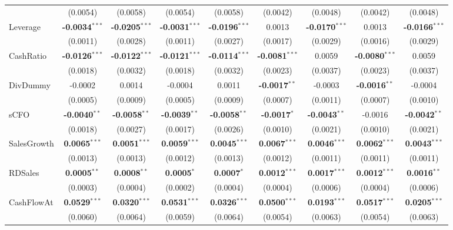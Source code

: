 \documentclass[11pt,a4paper]{article}
\begin{document}
\begin{table}[htbp]
\begin{tabular}{lcccccccc}
 & (0.0054) & (0.0058) & (0.0054) & (0.0058) & (0.0042) & (0.0048) & (0.0042) & (0.0048) \\
Leverage & \textbf{-0.0034}$^{***}$ & \textbf{-0.0205}$^{***}$ & \textbf{-0.0031}$^{***}$ & \textbf{-0.0196}$^{***}$ & 0.0013 & \textbf{-0.0170}$^{***}$ & 0.0013 & \textbf{-0.0166}$^{***}$ \\
 & (0.0011) & (0.0028) & (0.0011) & (0.0027) & (0.0017) & (0.0029) & (0.0016) & (0.0029) \\
CashRatio & \textbf{-0.0126}$^{***}$ & \textbf{-0.0122}$^{***}$ & \textbf{-0.0121}$^{***}$ & \textbf{-0.0114}$^{***}$ & \textbf{-0.0081}$^{***}$ & 0.0059 & \textbf{-0.0080}$^{***}$ & 0.0059 \\
 & (0.0018) & (0.0032) & (0.0018) & (0.0032) & (0.0023) & (0.0037) & (0.0023) & (0.0037) \\
DivDummy & -0.0002 & 0.0014 & -0.0004 & 0.0011 & \textbf{-0.0017}$^{**}$ & -0.0003 & \textbf{-0.0016}$^{**}$ & -0.0004 \\
 & (0.0005) & (0.0009) & (0.0005) & (0.0009) & (0.0007) & (0.0011) & (0.0007) & (0.0010) \\
sCFO & \textbf{-0.0040}$^{**}$ & \textbf{-0.0058}$^{**}$ & \textbf{-0.0039}$^{**}$ & \textbf{-0.0058}$^{**}$ & \textbf{-0.0017}$^{*}$ & \textbf{-0.0043}$^{**}$ & -0.0016 & \textbf{-0.0042}$^{**}$ \\
 & (0.0018) & (0.0027) & (0.0017) & (0.0026) & (0.0010) & (0.0021) & (0.0010) & (0.0021) \\
SalesGrowth & \textbf{0.0065}$^{***}$ & \textbf{0.0051}$^{***}$ & \textbf{0.0059}$^{***}$ & \textbf{0.0045}$^{***}$ & \textbf{0.0067}$^{***}$ & \textbf{0.0046}$^{***}$ & \textbf{0.0062}$^{***}$ & \textbf{0.0043}$^{***}$ \\
 & (0.0013) & (0.0013) & (0.0012) & (0.0013) & (0.0012) & (0.0011) & (0.0011) & (0.0011) \\
RDSales & \textbf{0.0005}$^{**}$ & \textbf{0.0008}$^{**}$ & \textbf{0.0005}$^{*}$ & \textbf{0.0007}$^{*}$ & \textbf{0.0012}$^{***}$ & \textbf{0.0017}$^{***}$ & \textbf{0.0012}$^{***}$ & \textbf{0.0016}$^{**}$ \\
 & (0.0003) & (0.0004) & (0.0002) & (0.0004) & (0.0004) & (0.0006) & (0.0004) & (0.0006) \\
CashFlowAt & \textbf{0.0529}$^{***}$ & \textbf{0.0320}$^{***}$ & \textbf{0.0531}$^{***}$ & \textbf{0.0326}$^{***}$ & \textbf{0.0500}$^{***}$ & \textbf{0.0193}$^{***}$ & \textbf{0.0517}$^{***}$ & \textbf{0.0205}$^{***}$ \\
 & (0.0060) & (0.0064) & (0.0059) & (0.0064) & (0.0054) & (0.0063) & (0.0054) & (0.0063) \\

\end{tabular}
\end{table}
\end{document}
